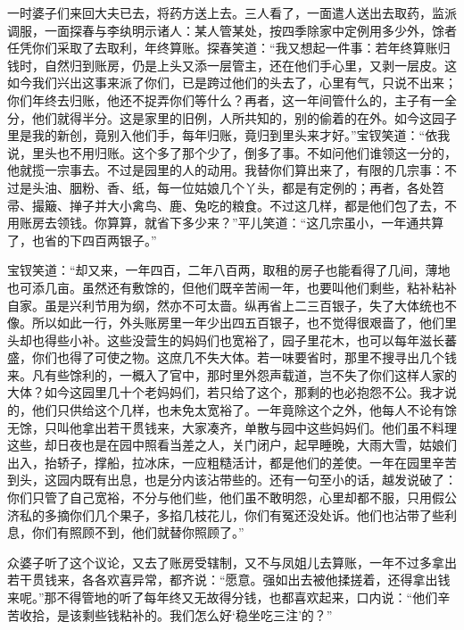 一时婆子们来回大夫已去，将药方送上去。三人看了，一面遣人送出去取药，监派调服，一面探春与李纨明示诸人：某人管某处，按四季除家中定例用多少外，馀者任凭你们采取了去取利，年终算账。探春笑道：“我又想起一件事：若年终算账归钱时，自然归到账房，仍是上头又添一层管主，还在他们手心里，又剥一层皮。这如今我们兴出这事来派了你们，已是跨过他们的头去了，心里有气，只说不出来；你们年终去归账，他还不捉弄你们等什么？再者，这一年间管什么的，主子有一全分，他们就得半分。这是家里的旧例，人所共知的，别的偷着的在外。如今这园子里是我的新创，竟别入他们手，每年归账，竟归到里头来才好。”宝钗笑道：“依我说，里头也不用归账。这个多了那个少了，倒多了事。不如问他们谁领这一分的，他就揽一宗事去。不过是园里的人的动用。我替你们算出来了，有限的几宗事：不过是头油、胭粉、香、纸，每一位姑娘几个丫头，都是有定例的；再者，各处笤帚、撮簸、掸子并大小禽鸟、鹿、兔吃的粮食。不过这几样，都是他们包了去，不用账房去领钱。你算算，就省下多少来？”平儿笑道：“这几宗虽小，一年通共算了，也省的下四百两银子。”

宝钗笑道：“却又来，一年四百，二年八百两，取租的房子也能看得了几间，薄地也可添几亩。虽然还有敷馀的，但他们既辛苦闹一年，也要叫他们剩些，粘补粘补自家。虽是兴利节用为纲，然亦不可太啬。纵再省上二三百银子，失了大体统也不像。所以如此一行，外头账房里一年少出四五百银子，也不觉得很艰啬了，他们里头却也得些小补。这些没营生的妈妈们也宽裕了，园子里花木，也可以每年滋长蕃盛，你们也得了可使之物。这庶几不失大体。若一味要省时，那里不搜寻出几个钱来。凡有些馀利的，一概入了官中，那时里外怨声载道，岂不失了你们这样人家的大体？如今这园里几十个老妈妈们，若只给了这个，那剩的也必抱怨不公。我才说的，他们只供给这个几样，也未免太宽裕了。一年竟除这个之外，他每人不论有馀无馀，只叫他拿出若干贯钱来，大家凑齐，单散与园中这些妈妈们。他们虽不料理这些，却日夜也是在园中照看当差之人，关门闭户，起早睡晚，大雨大雪，姑娘们出入，抬轿子，撑船，拉冰床，一应粗糙活计，都是他们的差使。一年在园里辛苦到头，这园内既有出息，也是分内该沾带些的。还有一句至小的话，越发说破了：你们只管了自己宽裕，不分与他们些，他们虽不敢明怨，心里却都不服，只用假公济私的多摘你们几个果子，多掐几枝花儿，你们有冤还没处诉。他们也沾带了些利息，你们有照顾不到，他们就替你照顾了。”

众婆子听了这个议论，又去了账房受辖制，又不与凤姐儿去算账，一年不过多拿出若干贯钱来，各各欢喜异常，都齐说：“愿意。强如出去被他揉搓着，还得拿出钱来呢。”那不得管地的听了每年终又无故得分钱，也都喜欢起来，口内说：“他们辛苦收拾，是该剩些钱粘补的。我们怎么好‘稳坐吃三注’的？”

